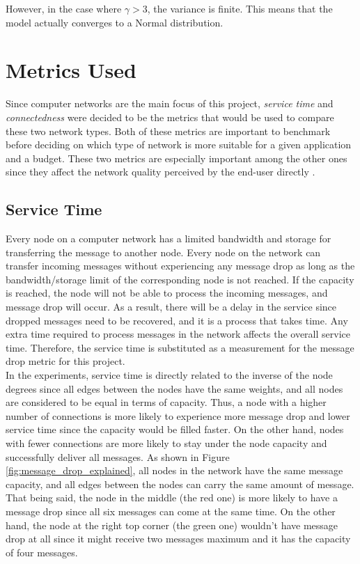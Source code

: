 \documentclass[journal]{IEEEtran}
\begin{document}
\noindent However, in the case where $\gamma > 3$, the variance is finite. This means that the model actually converges to a Normal distribution. 


\section{Metrics Used}
\noindent Since computer networks are the main focus of this project, \textit{service time} and \textit{connectedness} were decided to be the metrics that would be used to compare these two network types. Both of these metrics are important to benchmark before deciding on which type of network is more suitable for a given application and a budget. These two metrics are especially important among the other ones since they affect the network quality perceived by the end-user directly \cite{Yamamoto_Beerends}.

\subsection{Service Time}
\noindent Every node on a computer network has a limited bandwidth and storage for transferring the message to another node. Every node on the network can transfer incoming messages without experiencing any message drop as long as the bandwidth/storage limit of the corresponding node is not reached. If the capacity is reached, the node will not be able to process the incoming messages, and message drop will occur. As a result, there will be a delay in the service since dropped messages need to be recovered, and it is a process that takes time. Any extra time required to process messages in the network affects the overall service time. Therefore, the service time is substituted as a measurement for the message drop metric for this project.\\

\noindent In the experiments, service time is directly related to the inverse of the node degrees since all edges between the nodes have the same weights, and all nodes are considered to be equal in terms of capacity. Thus, a node with a higher number of connections is more likely to experience more message drop and lower service time since the capacity would be filled faster. On the other hand, nodes with fewer connections are more likely to stay under the node capacity and successfully deliver all messages. As shown in Figure \ref{fig:message_drop_explained}, all nodes in the network have the same message capacity, and all edges between the nodes can carry the same amount of message. That being said, the node in the middle (the red one) is more likely to have a message drop since all six messages can come at the same time. On the other hand, the node at the right top corner (the green one) wouldn't have message drop at all since it might receive two messages maximum and it has the capacity of four messages.\\
\end{document}
